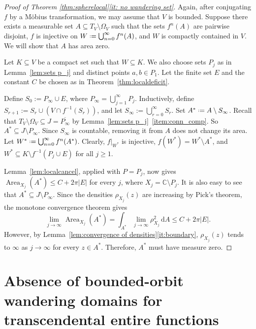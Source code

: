 \documentclass[12pt,a4paper,reqno]{amsart}
\newcommand{\Area}{\operatorname{Area}}
\theoremstyle{plain}
\newcommand{\dA}{\mathrm dA}
\renewcommand{\subset}{\subseteq}
\theoremstyle{definition}
\theoremstyle{remark}
\numberwithin{equation}{section}
\newcommand \C{\mathbb{C}}
\newcommand*{\defeq}{\mathrel{\vcenter{\baselineskip0.5ex \lineskiplimit0pt
                     \hbox{\scriptsize.}\hbox{\scriptsize.}}}%
                     =}
\begin{document}
\begin{proof}[Proof of Theorem \ref{thm:spherelocal}\ref{it: no wandering set}]

Again, after conjugating $f$ by a M\"obius transformation, we may assume that $V$ is bounded. Suppose there exists a measurable set $A \subset T_V \setminus \Omega_V$ such that the sets $f^n(A)$ are pairwise disjoint, $f$ is injective on $W \defeq \bigcup_{n=0}^\infty f^n(A)$, and $W$ is compactly contained in $V$. We will show that $A$ has area zero.

Let $K \subset V$ be a compact set such that $W \subset K$. We also choose sets $P_j$ as in Lemma~\ref{lem:sets p_j} and distinct points $a,b \in P_1$. Let the finite set $E$ and the constant $C$ be chosen as in Theorem~\ref{thm:localdeficit}.

Define $S_0 := P_\infty \cup E$, where $P_\infty = \bigcup_{j=1}^\infty P_j$. Inductively, define $S_{r+1} := S_r \cup (V \cap f^{-1}(S_r))$, and let $S_\infty := \bigcup_{r=0}^\infty S_r$. Set $A^* \defeq A \setminus S_\infty$. Recall that
$T_V\setminus \Omega_V\subset J = \overline{P_{\infty}}$ by
Lemma~\ref{lem:sets p_j}~\ref{item:conn_comp}. So
$A^*\subset J\setminus P_{\infty}$. Since $S_\infty$ is countable, removing it from $A$ does not change its area. Let $W^* \defeq \bigcup_{n=0}^\infty f^n(A^*)$. Clearly, $f|_{W^*}$ is injective, $f(W^*) = W^* \setminus A^*$, and $W^* \subset K \setminus f^{-1}(P_j \cup E)$ for all $j \geq 1$.

Lemma~\ref{lem:localcancel}, applied with $P = P_j$, now gives $\Area_{X_j}(A^*) \leq C + 2\pi|E|$ for every $j$, where $X_j = \C \setminus P_j$. It is also easy to see that $A^* \subset J \setminus P_\infty$. Since the densities $\rho_{X_j}(z)$ are increasing by Pick's theorem, the monotone convergence theorem gives
$$
    \lim_{j \to \infty} \Area_{X_j}(A^*) = \int_{A^*} \lim_{j \to \infty} \rho_{X_j}^2 \,\dA \leq C + 2\pi|E|.
$$
However, by Lemma~\ref{lem:convergence of densities}\eqref{it:boundary}, $\rho_{X_j}(z)$ tends to $\infty$ as $j \to \infty$ for every $z \in A^*$. Therefore, $A^*$ must have measure zero.

\end{proof}

\section{Absence of bounded-orbit wandering domains for transcendental entire functions}
\end{document}
